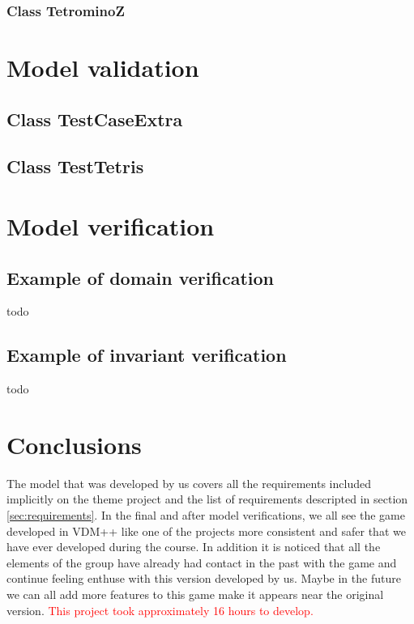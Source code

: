 \documentclass[a4paper]{article}
\begin{document}


\subsubsection{Class TetrominoZ}



\section{Model validation}



\subsection{Class TestCaseExtra} 



\subsection{Class TestTetris} 



\section{Model verification}

\subsection{Example of domain verification} 

todo

\subsection{Example of invariant verification} 

todo

\section{Conclusions} 

The model that was developed by us covers all the requirements included implicitly on the theme project and the list of requirements descripted in section \ref{sec:requirements}.
In the final and after model verifications, we all see the game developed in VDM++ like one of the projects more consistent and safer that we have ever developed during the course. 
In addition it is noticed that all the elements of the group have already had contact in the past with the game and continue feeling enthuse with this version developed by us. Maybe in the future we can all add more features to this game make it appears near the original version.
\textcolor{red}{This project took approximately 16 hours to develop.}
\end{document}
